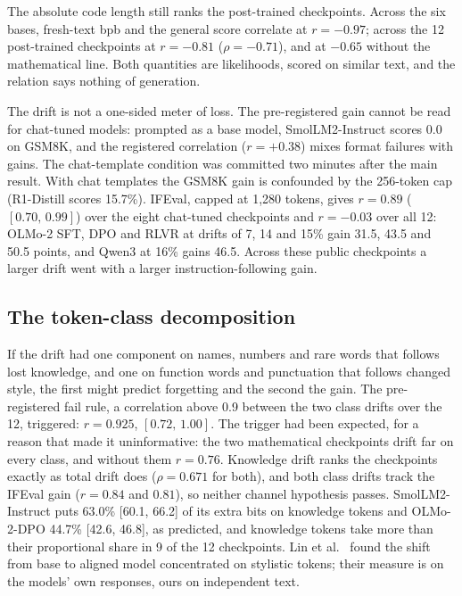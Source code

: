\documentclass[11pt,a4paper]{article}
\theoremstyle{definition}
\begin{document}
The absolute code length still ranks the post-trained checkpoints. Across the six bases, fresh-text bpb and the
general score correlate at $r=-0.97$; across the 12 post-trained checkpoints at $r=-0.81$ ($\rho=-0.71$), and at
$-0.65$ without the mathematical line. Both quantities are likelihoods, scored on similar text, and the relation
says nothing of generation.

The drift is not a one-sided meter of loss. The pre-registered gain cannot be read for chat-tuned models:
prompted as a base model, SmolLM2-Instruct scores 0.0 on GSM8K, and the registered correlation ($r=+0.38$) mixes
format failures with gains. The chat-template condition was committed two minutes after the main result. With chat
templates the GSM8K gain is confounded by the 256-token cap (R1-Distill scores 15.7\%). IFEval, capped at 1,280
tokens, gives $r=0.89$ ($[0.70,\,0.99]$) over the eight chat-tuned checkpoints and $r=-0.03$ over all 12: OLMo-2 SFT,
DPO and RLVR at drifts of 7, 14 and 15\% gain 31.5, 43.5 and 50.5 points, and Qwen3 at 16\% gains 46.5. Across these
public checkpoints a larger drift went with a larger instruction-following gain.

\subsection{The token-class decomposition}
\label{sec:classes}

If the drift had one component on names, numbers and rare words that follows lost knowledge, and one on function
words and punctuation that follows changed style, the first might predict forgetting and the second the gain. The
pre-registered fail rule, a correlation above 0.9 between the two class drifts over the 12, triggered: $r=0.925$,
$[0.72,\,1.00]$. The trigger had been expected, for a reason that made it uninformative: the two mathematical
checkpoints drift far on every class, and without them $r=0.76$. Knowledge drift ranks the checkpoints exactly as
total drift does ($\rho=0.671$ for both), and both class drifts track the IFEval gain ($r=0.84$ and $0.81$), so
neither channel hypothesis passes. SmolLM2-Instruct puts 63.0\% [60.1, 66.2] of its extra bits on knowledge
tokens and OLMo-2-DPO 44.7\% [42.6, 46.8], as predicted, and knowledge tokens take more than their proportional
share in 9 of the 12 checkpoints. Lin et al.\ \citep{lin2023urial} found the shift from base to aligned model
concentrated on stylistic tokens; their measure is on the models' own responses, ours on independent text.
\end{document}
